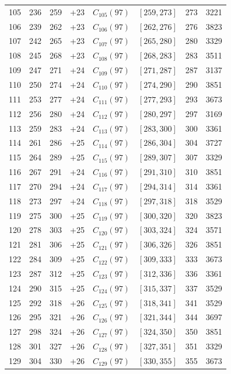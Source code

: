 \begin{longtable}{r r r r l c r r}
105 & 236 & 259 & +23 & $C_{105}(97)$ & $[259,273]$ & 273 & 3221\\
106 & 239 & 262 & +23 & $C_{106}(97)$ & $[262,276]$ & 276 & 3823\\
107 & 242 & 265 & +23 & $C_{107}(97)$ & $[265,280]$ & 280 & 3329\\
108 & 245 & 268 & +23 & $C_{108}(97)$ & $[268,283]$ & 283 & 3511\\
109 & 247 & 271 & +24 & $C_{109}(97)$ & $[271,287]$ & 287 & 3137\\
110 & 250 & 274 & +24 & $C_{110}(97)$ & $[274,290]$ & 290 & 3851\\
111 & 253 & 277 & +24 & $C_{111}(97)$ & $[277,293]$ & 293 & 3673\\
112 & 256 & 280 & +24 & $C_{112}(97)$ & $[280,297]$ & 297 & 3169\\
113 & 259 & 283 & +24 & $C_{113}(97)$ & $[283,300]$ & 300 & 3361\\
114 & 261 & 286 & +25 & $C_{114}(97)$ & $[286,304]$ & 304 & 3727\\
115 & 264 & 289 & +25 & $C_{115}(97)$ & $[289,307]$ & 307 & 3329\\
116 & 267 & 291 & +24 & $C_{116}(97)$ & $[291,310]$ & 310 & 3851\\
117 & 270 & 294 & +24 & $C_{117}(97)$ & $[294,314]$ & 314 & 3361\\
118 & 273 & 297 & +24 & $C_{118}(97)$ & $[297,318]$ & 318 & 3529\\
119 & 275 & 300 & +25 & $C_{119}(97)$ & $[300,320]$ & 320 & 3823\\
120 & 278 & 303 & +25 & $C_{120}(97)$ & $[303,324]$ & 324 & 3571\\
121 & 281 & 306 & +25 & $C_{121}(97)$ & $[306,326]$ & 326 & 3851\\
122 & 284 & 309 & +25 & $C_{122}(97)$ & $[309,333]$ & 333 & 3673\\
123 & 287 & 312 & +25 & $C_{123}(97)$ & $[312,336]$ & 336 & 3361\\
124 & 290 & 315 & +25 & $C_{124}(97)$ & $[315,337]$ & 337 & 3529\\
125 & 292 & 318 & +26 & $C_{125}(97)$ & $[318,341]$ & 341 & 3529\\
126 & 295 & 321 & +26 & $C_{126}(97)$ & $[321,344]$ & 344 & 3697\\
127 & 298 & 324 & +26 & $C_{127}(97)$ & $[324,350]$ & 350 & 3851\\
128 & 301 & 327 & +26 & $C_{128}(97)$ & $[327,351]$ & 351 & 3329\\
129 & 304 & 330 & +26 & $C_{129}(97)$ & $[330,355]$ & 355 & 3673\\

\end{longtable}
